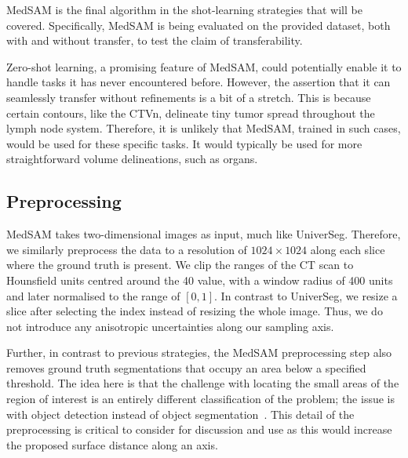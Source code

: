 \documentclass[11pt,twoside]{report}
\begin{document}
MedSAM is the final algorithm in the shot-learning strategies that will be covered. Specifically, MedSAM is being evaluated on the provided dataset, both with and without transfer, to test the claim of transferability.

Zero-shot learning, a promising feature of MedSAM, could potentially enable it to handle tasks it has never encountered before. However, the assertion that it can seamlessly transfer without refinements is a bit of a stretch. This is because certain contours, like the CTVn, delineate tiny tumor spread throughout the lymph node system. Therefore, it is unlikely that MedSAM, trained in such cases, would be used for these specific tasks. It would typically be used for more straightforward volume delineations, such as organs.

\subsection{Preprocessing}

MedSAM takes two-dimensional images as input, much like UniverSeg. Therefore, we similarly preprocess the data to a resolution of $1024 \times 1024$ along each slice where the ground truth is present. We clip the ranges of the CT scan to Hounsfield units centred around the 40 value, with a window radius of 400 units and later normalised to the range of $[0,1]$. In contrast to UniverSeg, we resize a slice after selecting the index instead of resizing the whole image. Thus, we do not introduce any anisotropic uncertainties along our sampling axis.

Further, in contrast to previous strategies, the MedSAM preprocessing step also removes ground truth segmentations that occupy an area below a specified threshold. The idea here is that the challenge with locating the small areas of the region of interest is an entirely different classification of the problem; the issue is with object detection instead of object segmentation~\cite{SAM, Ma2024}. This detail of the preprocessing is critical to consider for discussion and use as this would increase the proposed surface distance along an axis.


\end{document}
